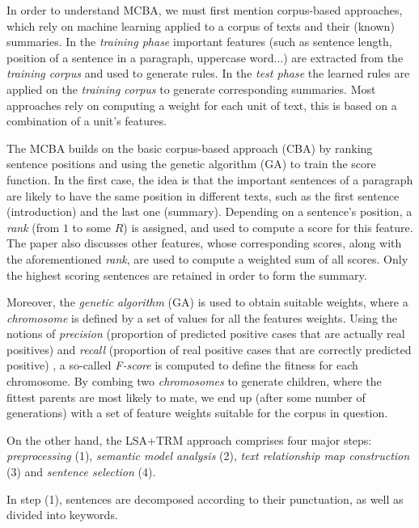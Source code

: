 \mbox{}

In order to understand MCBA, we must first mention corpus-based approaches, which rely on machine learning applied to a corpus of texts and their (known) summaries. In the \textit{training phase} important features (such as sentence length, position of a sentence in a paragraph, uppercase word...) are extracted from the \textit{training corpus} and used to generate rules. In the \textit{test phase} the learned rules are applied on the \textit{training corpus} to generate corresponding summaries. Most approaches rely on computing a weight for each unit of text, this is based on a combination of a unit's features.

The MCBA builds on the basic corpus-based approach (CBA) by ranking sentence positions and using the genetic algorithm (GA) to train the score function. In the first case, the idea is that the important sentences of a paragraph are likely to have the same position in different texts, such as the first sentence (introduction) and the last one (summary). Depending on a sentence's position, a \textit{rank} (from $1$ to some $R$) is assigned, and used to compute a score for this feature. The paper also discusses other features, whose corresponding scores, along with the aforementioned \textit{rank}, are used to compute a weighted sum of all scores. Only the highest scoring sentences are retained in order to form the summary.

Moreover, the \textit{genetic algorithm} (GA) is used to obtain suitable weights, where a \textit{chromosome} is defined by a set of values for all the features weights. Using the notions of \textit{precision} (proportion of predicted positive cases that are actually real positives) and \textit{recall} (proportion of real positive cases that are correctly predicted positive) \cite{powers_evaluation_2011}, a so-called \textit{F-score} is computed to define the fitness for each chromosome. By combing two \textit{chromosomes} to generate children, where the fittest parents are most likely to mate, we end up (after some number of generations) with a set of feature weights suitable for the corpus in question.

\mbox{}

On the other hand, the LSA+TRM approach comprises four major steps: \textit{preprocessing} (1), \textit{semantic model analysis} (2), \textit{text relationship map construction} (3) and \textit{sentence selection} (4).

In step (1), sentences are decomposed according to their punctuation, as well as divided into keywords.

